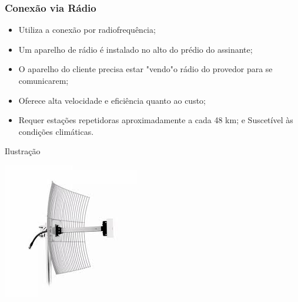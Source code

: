 \documentclass[aspectratio=169]{beamer} %
\begin{document}
\begin{frame}
	\frametitle{Conexão via Rádio}
			
	\begin{itemize}
		\item Utiliza a conexão por radiofrequência;
		\item Um aparelho de rádio é instalado no alto do prédio do assinante;
		\item O aparelho do cliente precisa estar "vendo"o rádio do provedor para se comunicarem;
		\item Oferece alta velocidade e eficiência quanto ao custo;
		\item Requer estações repetidoras aproximadamente a cada 48 km; e Suscetível às condições climáticas.
	\end{itemize}\vfill
	
	\begin{exampleblock}{Ilustra\c cão}
		\begin{center}
			\includegraphics[scale=0.4]{img/radio}
		\end{center}
	\end{exampleblock}
\end{frame}
\end{document}
